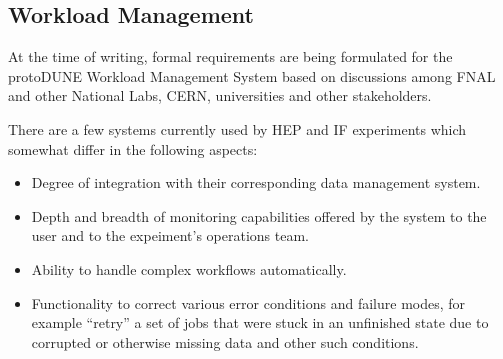 \subsection{Workload Management}
\label{sec:dune-wms}

At the time of writing, formal requirements are being formulated for the protoDUNE Workload Management System based on
discussions among FNAL and other National Labs, CERN, universities and other stakeholders. 

There are a few systems currently used by HEP and IF experiments which somewhat differ in the following aspects:
\begin{itemize}

\item Degree of integration with their corresponding data management system.

\item Depth and breadth of monitoring capabilities offered by the system to the user and to the expeiment's operations team.

\item Ability to handle complex workflows automatically.

\item Functionality to correct various error conditions and failure modes, for example ``retry'' a set of jobs that were stuck in an unfinished state
due to corrupted or otherwise missing data and other such conditions.

\end{itemize}

